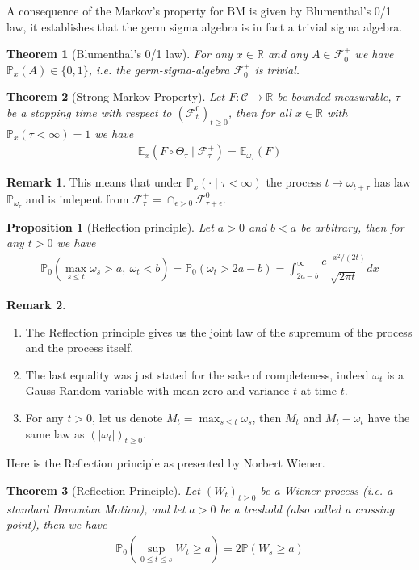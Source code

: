 \documentclass[11pt,a4paper, final]{article}
\newtheorem{thm}{Theorem}[section]
\newtheorem{prop}{Proposition}[section]
\theoremstyle{definition}
\newtheorem{rem}{Remark}[section]
\begin{document}
\noindent A consequence of the Markov's property for BM is given by Blumenthal's 0/1 law, it establishes that the germ sigma algebra is in fact a trivial sigma algebra.
\begin{thm}[Blumenthal's 0/1 law] For any $x \in \mathbb{R}$ and any $A \in \mathcal{F}_0^+$ we have $\mathbb{P}_x(A) \in \lbrace 0,1 \rbrace$, i.e. the germ-sigma-algebra $\mathcal{F}_0^+$ is trivial. 
\end{thm}
\begin{thm}[Strong Markov Property] Let $F: \mathcal{C} \to \mathbb{R}$ be bounded measurable, $\tau$ be a stopping time with respect to $(\mathcal{F}_t^0)_{t \geq 0}$, then for all $x \in \mathbb{R}$ with $\mathbb{P}_x( \tau < \infty) =1$ we have 
\begin{align*}
\mathbb{E}_x( F \circ \Theta_\tau  \mid \mathcal{F}_\tau^+) = \mathbb{E}_{\omega_\tau} ( F)
\end{align*}
\end{thm}
\begin{rem} This means that under $\mathbb{P}_x(  \cdot \mid \tau < \infty)$ the process $t \mapsto \omega_{t + \tau}$ has law $\mathbb{P}_{ \omega_\tau}$ and is indepent from $\mathcal{F}_\tau^+ = \cap_{ \epsilon >0} \mathcal{F}_{\tau + \epsilon}^0$.
\end{rem}
\newpage
\begin{prop}[Reflection principle] Let $a>0$ and $b<a$ be arbitrary, then for any $t>0$ we have 
\begin{align*}
\mathbb{P}_0 \left( \max_{s \leq t} \omega_s >a, \ \omega_t < b \right) = \mathbb{P}_0( \omega_t > 2a-b) = \int_{2a-b}^\infty \dfrac{e^{-x^2/(2t)}}{\sqrt{2 \pi t}} dx 
\end{align*}
\end{prop}
\begin{rem} \
\begin{enumerate}
\item The Reflection principle gives us the joint law of the supremum of the process and the process itself. 
\item The last equality was just stated for the sake of completeness, indeed $\omega_t$ is a Gauss Random variable with mean zero and variance $t$ at time $t$. 
\item For any $t>0$, let us denote $M_t= \max_{s \leq t} \omega_s$, then $M_t$ and $M_t- \omega_t$ have the same law as $(|\omega_t|)_{t \geq 0}$. 
\end{enumerate}
\end{rem}
\noindent Here is the Reflection principle as presented by Norbert Wiener.
\begin{thm}[Reflection Principle] Let $(W_t)_{t \geq 0}$ be a Wiener process (i.e. a standard Brownian Motion), and let $a>0$ be a treshold (also called a crossing point), then we have 
\begin{align*}
\mathbb{P}_0 \left( \sup_{0 \leq t \leq s } W_t \geq a \right) = 2 \mathbb{P}(  W_s \geq a)
\end{align*} 
\end{thm}
\end{document}
